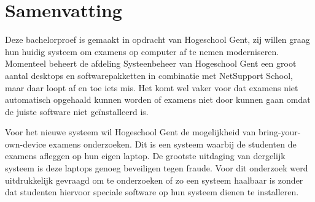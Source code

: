 
%
%

%



\chapter*{Samenvatting}

Deze bachelorproef is gemaakt in opdracht van Hogeschool Gent, zij willen graag hun huidig systeem om examens op computer af te nemen moderniseren. Momenteel beheert de afdeling Systeenbeheer van Hogeschool Gent een groot aantal desktops en softwarepakketten in combinatie met NetSupport School, maar daar loopt af en toe iets mis. Het komt wel vaker voor dat examens niet automatisch opgehaald kunnen worden of examens niet door kunnen gaan omdat de juiste software niet ge\"{i}nstalleerd is. 

Voor het nieuwe systeem wil Hogeschool Gent de mogelijkheid van bring-your-own-device examens onderzoeken. Dit is een systeem waarbij de studenten de examens afleggen op hun eigen laptop. De grootste uitdaging van dergelijk systeem is deze laptops genoeg beveiligen tegen fraude. Voor dit onderzoek werd uitdrukkelijk gevraagd om te onderzoeken of zo een systeem haalbaar is zonder dat studenten hiervoor speciale software op hun systeem dienen te installeren.

